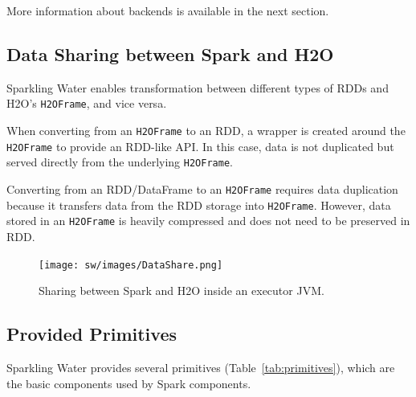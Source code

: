 \documentclass{standalone}
\begin{document}
More information about backends is available in the next section.

\subsection{Data Sharing between Spark and H2O}

Sparkling Water enables transformation between different types of RDDs and H2O's \texttt{H2OFrame}, and vice versa.

When converting from an \texttt{H2OFrame} to an RDD, a wrapper is created around the \texttt{H2OFrame} to provide an RDD-like API. In this case,  data is not duplicated but served directly from the underlying \texttt{H2OFrame}.

Converting from an RDD/DataFrame to an \texttt{H2OFrame} requires data duplication because it transfers data from the RDD storage into \texttt{H2OFrame}. However, data stored in an \texttt{H2OFrame} is heavily compressed and does not need to be preserved in RDD.

\begin{figure}[h!]
	\centering
	\texttt{[image: sw/images/DataShare.png]}
	\caption{Sharing between Spark and H2O inside an executor JVM.}
\end{figure}

\subsection{Provided Primitives}

Sparkling Water provides several primitives (Table~\ref{tab:primitives}), which are the basic components used by Spark components.
\end{document}
